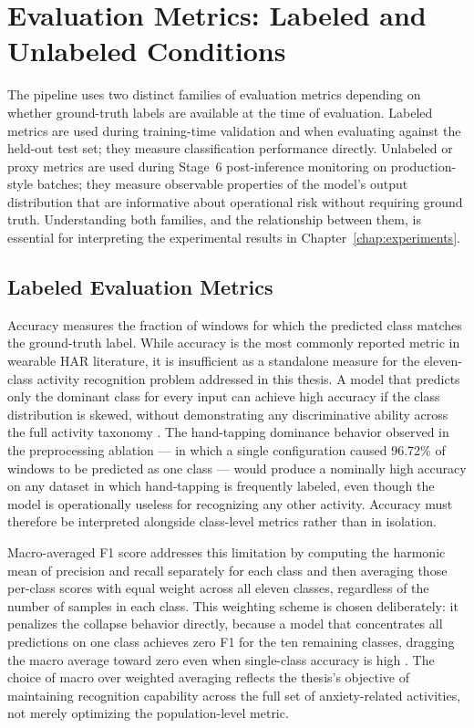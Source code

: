 \section{Evaluation Metrics: Labeled and Unlabeled Conditions}
\label{sec:eval_metrics}

The pipeline uses two distinct families of evaluation metrics depending on whether ground-truth labels are available at the time of evaluation. Labeled metrics are used during training-time validation and when evaluating against the held-out test set; they measure classification performance directly. Unlabeled or proxy metrics are used during Stage~6 post-inference monitoring on production-style batches; they measure observable properties of the model's output distribution that are informative about operational risk without requiring ground truth. Understanding both families, and the relationship between them, is essential for interpreting the experimental results in Chapter~\ref{chap:experiments}.

\subsection{Labeled Evaluation Metrics}

Accuracy measures the fraction of windows for which the predicted class matches the ground-truth label. While accuracy is the most commonly reported metric in wearable HAR literature, it is insufficient as a standalone measure for the eleven-class activity recognition problem addressed in this thesis. A model that predicts only the dominant class for every input can achieve high accuracy if the class distribution is skewed, without demonstrating any discriminative ability across the full activity taxonomy \cite{bulling2014tutorial,lara2013survey,hammerla2016deep}. The hand-tapping dominance behavior observed in the preprocessing ablation --- in which a single configuration caused 96.72\% of windows to be predicted as one class --- would produce a nominally high accuracy on any dataset in which hand-tapping is frequently labeled, even though the model is operationally useless for recognizing any other activity. Accuracy must therefore be interpreted alongside class-level metrics rather than in isolation.

Macro-averaged F1 score addresses this limitation by computing the harmonic mean of precision and recall separately for each class and then averaging those per-class scores with equal weight across all eleven classes, regardless of the number of samples in each class. This weighting scheme is chosen deliberately: it penalizes the collapse behavior directly, because a model that concentrates all predictions on one class achieves zero F1 for the ten remaining classes, dragging the macro average toward zero even when single-class accuracy is high \cite{bulling2014tutorial}. The choice of macro over weighted averaging reflects the thesis's objective of maintaining recognition capability across the full set of anxiety-related activities, not merely optimizing the population-level metric.

